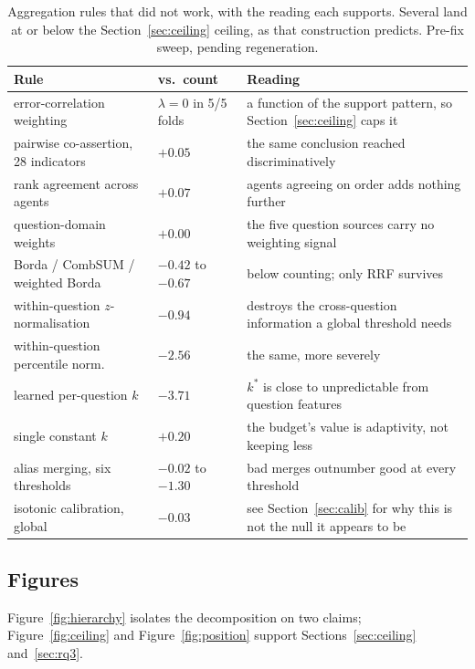 \documentclass{article}
\begin{document}
\begin{table}
  \caption{Aggregation rules that did not work, with the reading each supports. Several land at or below the Section~\ref{sec:ceiling} ceiling, as that construction predicts. Pre-fix sweep, pending regeneration.}
  \label{tab:negative}
  \centering
  \begin{tabular}{llp{5.4cm}}
    \toprule
    Rule & vs.\ count & Reading \\
    \midrule
    error-correlation weighting   & $\lambda=0$ in 5/5 folds & a function of the support pattern, so Section~\ref{sec:ceiling} caps it \\
    pairwise co-assertion, 28 indicators & $+0.05$ & the same conclusion reached discriminatively \\
    rank agreement across agents  & $+0.07$ & agents agreeing on order adds nothing further \\
    question-domain weights       & $+0.00$ & the five question sources carry no weighting signal \\
    Borda / CombSUM / weighted Borda & $-0.42$ to $-0.67$ & below counting; only RRF survives \\
    within-question $z$-normalisation & $-0.94$ & destroys the cross-question information a global threshold needs \\
    within-question percentile norm.  & $-2.56$ & the same, more severely \\
    learned per-question $k$      & $-3.71$ & $k^*$ is close to unpredictable from question features \\
    single constant $k$           & $+0.20$ & the budget's value is adaptivity, not keeping less \\
    alias merging, six thresholds & $-0.02$ to $-1.30$ & bad merges outnumber good at every threshold \\
    isotonic calibration, global  & $-0.03$ & see Section~\ref{sec:calib} for why this is not the null it appears to be \\
    \bottomrule
  \end{tabular}
\end{table}


\subsection{Figures}
\label{app:figs}

Figure~\ref{fig:hierarchy} isolates the decomposition on two claims; Figure~\ref{fig:ceiling} and Figure~\ref{fig:position} support Sections~\ref{sec:ceiling} and~\ref{sec:rq3}.
\end{document}
